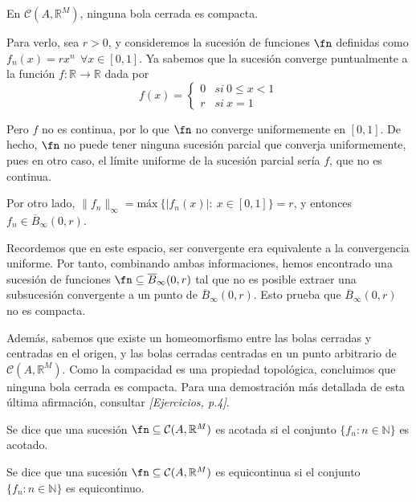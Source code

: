 \begin{ejemplo} En $\mathcal{C}(A,\mathbb{R}^M)$, ninguna bola cerrada es compacta.

  Para verlo, sea $r>0$, y consideremos la sucesión de funciones $\fn$ definidas como $f_n(x) = rx^n \ \ \forall x \in [0,1]$. Ya sabemos que la sucesión converge puntualmente a la función $f: \mathbb{R} \to \mathbb{R}$ dada por $$f(x) = \begin{cases} 0 & si\ 0 \le x < 1\\ r & si\ x = 1 \end{cases}$$

  Pero $f$ no es continua, por lo que $\fn$ no converge uniformemente en $[0,1]$. De hecho, $\fn$ no puede tener ninguna sucesión parcial que converja uniformemente, pues en otro caso, el límite uniforme de la sucesión parcial sería $f$, que no es continua.

  Por otro lado, $\|f_n\|_{\infty} = \text{máx} \ \{ |f_n(x)|:\ x \in [0,1]\} = r$, y entonces $f_n \in \overline{B}_{\infty}(0,r)$.

  Recordemos que en este espacio, ser convergente era equivalente a la convergencia uniforme. Por tanto, combinando ambas informaciones, hemos encontrado una sucesión de funciones $\fn \subseteq \overline{B}_{\infty}(0,r)$ tal que no es posible extraer una subsucesión convergente a un punto de $\overline{B}_{\infty}(0,r)$. Esto prueba que $\overline{B}_{\infty}(0,r)$ no es compacta.

  Además, sabemos que existe un homeomorfismo entre las bolas cerradas y centradas en el origen, y las bolas cerradas centradas en un punto arbitrario de $\mathcal{C}(A,\mathbb{R}^M)$. Como la compacidad es una propiedad topológica, concluimos que ninguna bola cerrada es compacta. Para una demostración más detallada de esta última afirmación, consultar \textit{[Ejercicios, p.4]}.
\end{ejemplo}

\begin{ndef}
  Se dice que una sucesión $\fn \subseteq \mathcal{C}(A,\mathbb{R}^M)$ es acotada si el conjunto $\{ f_n: n \in \mathbb{N}\}$ es acotado.
\end{ndef}

\begin{ndef}
  Se dice que una sucesión $\fn \subseteq \mathcal{C}(A,\mathbb{R}^M)$ es equicontinua si el conjunto $\{ f_n: n \in \mathbb{N}\}$ es equicontinuo.
\end{ndef}


